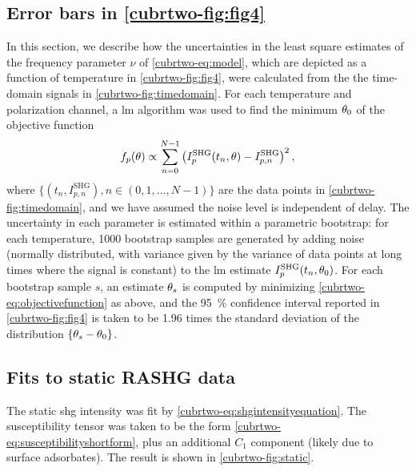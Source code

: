 \subsection{Error bars in \cref{cubrtwo-fig:fig4}}\label{cubrtwo-sup:errorbars}
In this section, we describe how the uncertainties in the least square estimates of the frequency parameter $\nu$ of \cref{cubrtwo-eq:model}, which are depicted as a function of temperature in \cref{cubrtwo-fig:fig4}, were calculated from the the time-domain signals in \cref{cubrtwo-fig:timedomain}.
For each temperature and polarization channel, a \gls{lm} algorithm was used to find the minimum $\theta_0$ of the objective function
\begin{equation}\label{cubrtwo-eq:objectivefunction}
f_p(\theta) \propto \sum_{n=0}^{N-1}\left(I^\mathrm{SHG}_p(t_n, \theta) - I^\mathrm{SHG}_{p,n}\right)^2,
\end{equation}
where $\{(t_n, I^\mathrm{SHG}_{p,n}), n\in (0, 1, \ldots, N-1)\}$ are the data points in \cref{cubrtwo-fig:timedomain}, and we have assumed the noise level is independent of delay.
The uncertainty in each parameter is estimated within a parametric bootstrap\citep{dekking}: for each temperature, \num{1000} bootstrap samples are generated by adding noise (normally distributed, with variance given by the variance of data points at long times where the signal is constant) to the \gls{lm} estimate $I^\mathrm{SHG}_p(t_n, \theta_0)$.
For each bootstrap sample $s$, an estimate $\theta_s$ is computed by minimizing \cref{cubrtwo-eq:objectivefunction} as above, and the \qty{95}{\percent} confidence interval reported in \cref{cubrtwo-fig:fig4} is taken to be \num{1.96} times the standard deviation of the distribution $\{\theta_s-\theta_0\}$.

\subsection{Fits to static RASHG data}\label{cubrtwo-sup:static}
The static \gls{shg} intensity was fit by \cref{cubrtwo-eq:shgintensityequation}.
The susceptibility tensor was taken to be the form \cref{cubrtwo-eq:susceptibilityshortform}, plus an additional $C_1$ component (likely due to surface adsorbates).
The result is shown in \cref{cubrtwo-fig:static}.

